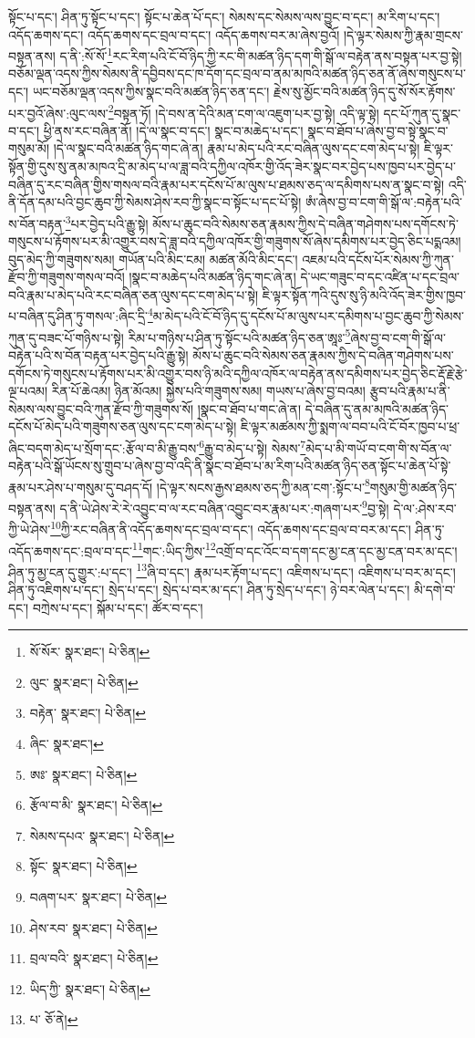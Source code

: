སྟོང་པ་དང་། ཤིན་ཏུ་སྟོང་པ་དང་། སྟོང་པ་ཆེན་པོ་དང་། སེམས་དང་སེམས་ལས་བྱུང་བ་དང་། མ་རིག་པ་དང་། འདོད་ཆགས་དང་། འདོད་ཆགས་དང་བྲལ་བ་དང་། འདོད་ཆགས་བར་མ་ཞེས་བྱའོ། །དེ་ལྟར་སེམས་ཀྱི་རྣམ་གྲངས་བསྟན་ནས། ད་ནི་:སོ་སོ་\footnote{སོ་སོར་  སྣར་ཐང་།  པེ་ཅིན། }རང་རིག་པའི་ངོ་བོ་ཉིད་ཀྱི་རང་གི་མཚན་ཉིད་དག་གི་སྒོ་ལ་བརྟེན་ནས་བསྟན་པར་བྱ་སྟེ། བཅོམ་ལྡན་འདས་ཀྱིས་སེམས་ནི་དབྱིབས་དང་ཁ་དོག་དང་བྲལ་བ་ནམ་མཁའི་མཚན་ཉིད་ཅན་ནོ་ཞེས་གསུངས་པ་དང་། ཡང་བཅོམ་ལྡན་འདས་ཀྱིས་སྣང་བའི་མཚན་ཉིད་ཅན་དང་། རྗེས་སུ་མྱོང་བའི་མཚན་ཉིད་དུ་སོ་སོར་རྟོགས་པར་བྱའོ་ཞེས་:ལུང་ལས་\footnote{ལུང་  སྣར་ཐང་།  པེ་ཅིན། }བསྟན་ཏོ། །དེ་བས་ན་དེའི་མན་ངག་ལ་འཇུག་པར་བྱ་སྟེ། འདི་ལྟ་སྟེ། དང་པོ་ཀུན་དུ་སྣང་བ་དང་། ཕྱི་ནས་རང་བཞིན་ནོ། །དེ་ལ་སྣང་བ་དང་། སྣང་བ་མཆེད་པ་དང་། སྣང་བ་ཐོབ་པ་ཞེས་བྱ་བ་སྟེ་སྣང་བ་གསུམ་མོ། །དེ་ལ་སྣང་བའི་མཚན་ཉིད་གང་ཞེ་ན། རྣམ་པ་མེད་པའི་རང་བཞིན་ལུས་དང་ངག་མེད་པ་སྟེ། ཇི་ལྟར་སྟོན་གྱི་དུས་སུ་ནམ་མཁའ་དྲི་མ་མེད་པ་ལ་ཟླ་བའི་དཀྱིལ་འཁོར་གྱི་འོད་ཟེར་སྣང་བར་བྱེད་པས་ཁྱབ་པར་བྱེད་པ་བཞིན་དུ་རང་བཞིན་གྱིས་གསལ་བའི་རྣམ་པར་དངོས་པོ་མ་ལུས་པ་ཐམས་ཅད་ལ་དམིགས་པས་ན་སྣང་བ་སྟེ། འདི་ནི་དོན་དམ་པའི་བྱང་ཆུབ་ཀྱི་སེམས་ཤེས་རབ་ཀྱི་སྣང་བ་སྟོང་པ་དང་པོ་སྟེ། ཨཾ་ཞེས་བྱ་བ་ངག་གི་སྒོ་ལ་:བརྟེན་པའི་ས་བོན་བརྟན་\footnote{བརྟེན་  སྣར་ཐང་།  པེ་ཅིན། }པར་བྱེད་པའི་རྒྱུ་སྟེ། མོས་པ་ཆུང་བའི་སེམས་ཅན་རྣམས་ཀྱིས་དེ་བཞིན་གཤེགས་པས་དགོངས་ཏེ་གསུངས་པ་རྟོགས་པར་མི་འགྱུར་བས་དེ་ཟླ་བའི་དཀྱིལ་འཁོར་གྱི་གཟུགས་སོ་ཞེས་དམིགས་པར་བྱེད་ཅིང་པདྨའམ། བུད་མེད་ཀྱི་གཟུགས་སམ། གཡོན་པའི་མིང་ངམ། མཚན་མོའི་མིང་དང་། འཇམ་པའི་དངོས་པོར་སེམས་ཀྱི་ཀུན་རྫོབ་ཀྱི་གཟུགས་གསལ་བའོ། །སྣང་བ་མཆེད་པའི་མཚན་ཉིད་གང་ཞེ་ན། དེ་ཡང་གཟུང་བ་དང་འཛིན་པ་དང་བྲལ་བའི་རྣམ་པ་མེད་པའི་རང་བཞིན་ཅན་ལུས་དང་ངག་མེད་པ་སྟེ། ཇི་ལྟར་སྟོན་ཀའི་དུས་སུ་ཉི་མའི་འོད་ཟེར་གྱིས་ཁྱབ་པ་བཞིན་དུ་ཤིན་ཏུ་གསལ་:ཞིང་དྲི་\footnote{ཞིང་  སྣར་ཐང་། }མ་མེད་པའི་ངོ་བོ་ཉིད་དུ་དངོས་པོ་མ་ལུས་པར་དམིགས་པ་བྱང་ཆུབ་ཀྱི་སེམས་ཀུན་དུ་བཟང་པོ་གཉིས་པ་སྟེ། རིམ་པ་གཉིས་པ་ཤིན་ཏུ་སྟོང་པའི་མཚན་ཉིད་ཅན་ཨཱཿ་\footnote{ཨཿ་  སྣར་ཐང་།  པེ་ཅིན། }ཞེས་བྱ་བ་ངག་གི་སྒོ་ལ་བརྟེན་པའི་ས་བོན་བརྟན་པར་བྱེད་པའི་རྒྱུ་སྟེ། མོས་པ་ཆུང་བའི་སེམས་ཅན་རྣམས་ཀྱིས་དེ་བཞིན་གཤེགས་པས་དགོངས་ཏེ་གསུངས་པ་རྟོགས་པར་མི་འགྱུར་བས་ཉི་མའི་དཀྱིལ་འཁོར་ལ་བརྟེན་ནས་དམིགས་པར་བྱེད་ཅིང་རྡོ་རྗེ་རྩེ་ལྔ་པའམ། རིན་པོ་ཆེའམ། ཉིན་མོའམ། སྐྱེས་པའི་གཟུགས་སམ། གཡས་པ་ཞེས་བྱ་བའམ། རྩུབ་པའི་རྣམ་པ་ནི་སེམས་ལས་བྱུང་བའི་ཀུན་རྫོབ་ཀྱི་གཟུགས་སོ། །སྣང་བ་ཐོབ་པ་གང་ཞེ་ན། དེ་བཞིན་དུ་ནམ་མཁའི་མཚན་ཉིད་དངོས་པོ་མེད་པའི་གཟུགས་ཅན་ལུས་དང་ངག་མེད་པ་སྟེ། ཇི་ལྟར་མཚམས་ཀྱི་སྨག་ལ་བབ་པའི་ངོ་བོར་ཁྱབ་པ་ཕྲ་ཞིང་བདག་མེད་པ་སྲོག་དང་:རྩོལ་བ་མི་རྒྱུ་བས་\footnote{རྩོལ་བ་མི་  སྣར་ཐང་།  པེ་ཅིན། }རྒྱུ་བ་མེད་པ་སྟེ། སེམས་\footnote{སེམས་དཔའ་  སྣར་ཐང་།  པེ་ཅིན། }མེད་པ་མི་གཡོ་བ་ངག་གི་ས་བོན་ལ་བརྟེན་པའི་སྒོ་ཡོངས་སུ་གྲུབ་པ་ཞེས་བྱ་བ་འདི་ནི་སྣང་བ་ཐོབ་པ་མ་རིག་པའི་མཚན་ཉིད་ཅན་སྟོང་པ་ཆེན་པོ་སྟེ་རྣམ་པར་ཤེས་པ་གསུམ་དུ་བཤད་དོ། །དེ་ལྟར་སངས་རྒྱས་ཐམས་ཅད་ཀྱི་མན་ངག་:སྟོང་པ་\footnote{སྟོང་  སྣར་ཐང་།  པེ་ཅིན། }གསུམ་གྱི་མཚན་ཉིད་བསྟན་ནས། ད་ནི་ཡེ་ཤེས་རེ་རེ་འབྱུང་བ་ལ་རང་བཞིན་འབྱུང་བར་རྣམ་པར་:གཞག་པར་\footnote{བཞག་པར་  སྣར་ཐང་།  པེ་ཅིན། }བྱ་སྟེ། དེ་ལ་:ཤེས་རབ་ཀྱི་ཡེ་ཤེས་\footnote{ཤེས་རབ་  སྣར་ཐང་།  པེ་ཅིན། }ཀྱི་རང་བཞིན་ནི་འདོད་ཆགས་དང་བྲལ་བ་དང་། འདོད་ཆགས་དང་བྲལ་བ་བར་མ་དང་། ཤིན་ཏུ་འདོད་ཆགས་དང་:བྲལ་བ་དང་\footnote{བྲལ་བའི་  སྣར་ཐང་།  པེ་ཅིན། }གང་:ཡིད་ཀྱིས་\footnote{ཡིད་ཀྱི་  སྣར་ཐང་།  པེ་ཅིན། }འགྲོ་བ་དང་འོང་བ་དག་དང་མྱ་ངན་དང་མྱ་ངན་བར་མ་དང་། ཤིན་ཏུ་མྱ་ངན་དུ་གྱུར་:པ་དང་། \footnote{པ་  ཅོ་ནེ། }ཞི་བ་དང་། རྣམ་པར་རྟོག་པ་དང་། འཇིགས་པ་དང་། འཇིགས་པ་བར་མ་དང་། ཤིན་ཏུ་འཇིགས་པ་དང་། སྲེད་པ་དང་། སྲེད་པ་བར་མ་དང་། ཤིན་ཏུ་སྲེད་པ་དང་། ཉེ་བར་ལེན་པ་དང་། མི་དགེ་བ་དང་། བཀྲེས་པ་དང་། སྐོམ་པ་དང་། ཚོར་བ་དང་། 